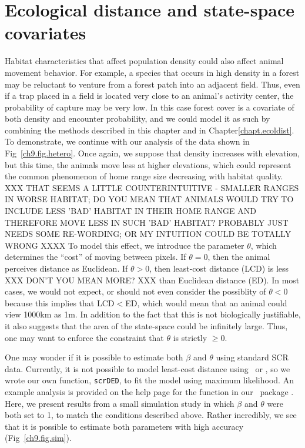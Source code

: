 \section{Ecological distance and state-space covariates}

Habitat characteristics that affect population
density could also affect animal movement behavior. For example, a
species that occurs in high density in a forest may be reluctant to
venture from a forest patch into an adjacent field. Thus, even if a
trap placed in a field is located very close to an animal's activity
center, the probability of capture may be very low. In this case
forest cover is a covariate of both density and encounter probability,
and we could model it as such by combining the methods described in
this chapter and in Chapter\ref{chapt.ecoldist}. To demonstrate, we
continue with our analysis of the data shown in
Fig~\ref{ch9.fig.hetero}. Once again, we suppose that density
increases with elevation, but this time, the animals move less at
higher elevations, which could represent the common phenomenon of home
range size decreasing with habitat quality. XXX THAT SEEMS A LITTLE COUNTERINTUITIVE - SMALLER RANGES IN WORSE HABITAT; DO YOU MEAN THAT ANIMALS WOULD TRY TO INCLUDE LESS 'BAD' HABITAT IN THEIR HOME RANGE AND THEREFORE MOVE LESS IN SUCH 'BAD' HABITAT? PROBABLY JUST NEEDS SOME RE-WORDING; OR MY INTUITION COULD BE TOTALLY WRONG XXXX To model this effect, we
introduce the parameter $\theta$, which determines the ``cost'' of
moving between pixels. If $\theta=0$, then the animal perceives
distance as Euclidean. If $\theta>0$, then least-cost distance (LCD)
is less XXX DON'T YOU MEAN MORE? XXX than Euclidean distance (ED). In most cases, we would not expect,
or should not even consider the possiblity of $\theta<0$ because this
implies that LCD$<$ED, which would mean that an animal could view
1000km as 1m. In addition to the fact that this is not biologically
justifiable, it also suggests that the area of the state-space could
be infinitely large. Thus, one may want to enforce the constraint that
$\theta$ is strictly $\geq 0$.

One may wonder if it is possible to estimate both $\beta$
and $\theta$ using standard SCR data. Currently, it is not possible to
model least-cost distance using \jags~or \secr, so we wrote our own
function, \verb+scrDED+, to fit the model using maximum likelihood. An
example analysis is provided on the help page for the function in our
\R~package \scrbook. Here, we present results from a small simulation
study in which $\beta$ and $\theta$ were both set to 1, to match the
conditions described above. Rather incredibly, we see that it is
possible to estimate both parameters with high accuracy
(Fig~\ref{ch9.fig.sim}).

